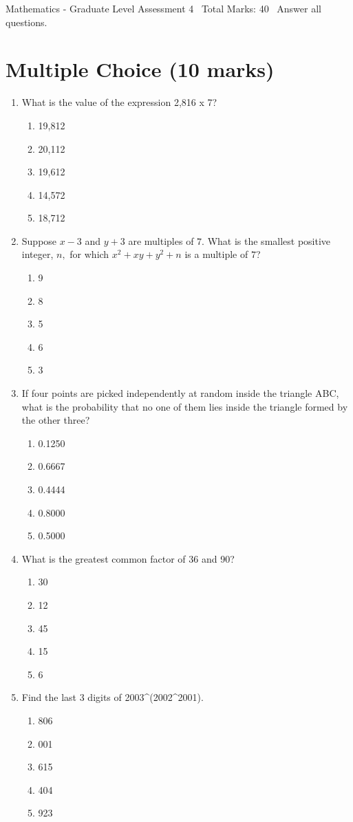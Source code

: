 \documentclass[12pt]{article}
\begin{document}
\begin{center}
Mathematics - Graduate Level Assessment 4 \
Total Marks: 40 \
Answer all questions.
\end{center}

\section*{Multiple Choice (10 marks)}
\begin{enumerate}[label=\arabic*.]
\item What is the value of the expression 2,816 x 7?
\begin{enumerate}[label=(\alph*)]
    \item 19,812
    \item 20,112
    \item 19,612
    \item 14,572
    \item 18,712
\end{enumerate}
\item Suppose $x-3$ and $y+3$ are multiples of $7$. What is the smallest positive integer, $n,$
for which $x^2+xy+y^2+n$ is a multiple of $7$?
\begin{enumerate}[label=(\alph*)]
    \item 9
    \item 8
    \item 5
    \item 6
    \item 3
\end{enumerate}
\item If four points are picked independently at random inside the triangle ABC, what is the
probability that no one of them lies inside the triangle formed by the other three?
\begin{enumerate}[label=(\alph*)]
    \item 0.1250
    \item 0.6667
    \item 0.4444
    \item 0.8000
    \item 0.5000
\end{enumerate}
\item What is the greatest common factor of 36 and 90?
\begin{enumerate}[label=(\alph*)]
    \item 30
    \item 12
    \item 45
    \item 15
    \item 6
\end{enumerate}
\item Find the last 3 digits of 2003\^{}(2002\^{}2001).
\begin{enumerate}[label=(\alph*)]
    \item 806
    \item 001
    \item 615
    \item 404
    \item 923
\end{enumerate}
\end{enumerate}
\end{document}
